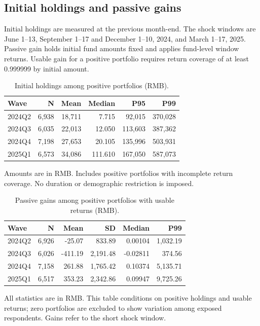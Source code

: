 \documentclass[11pt,letterpaper,english,final]{article}
\begin{document}
\clearpage
\subsection{Initial holdings and passive gains}
Initial holdings are measured at the previous month-end. The shock windows are June 1--13, September 1--17 and December 1--10, 2024, and March 1--17, 2025. Passive gain holds initial fund amounts fixed and applies fund-level window returns. Usable gain for a positive portfolio requires return coverage of at least 0.999999 by initial amount.

\begin{table}[H]
\centering\small
\setlength{\tabcolsep}{5pt}
\caption{Initial holdings among positive portfolios (RMB).}
\begin{tabular}{lrrrrr}
\toprule
Wave & N & Mean & Median & P95 & P99 \\
\midrule
2024Q2 & 6,938 & 18,711 & 7.715 & 92,015 & 370,028 \\
2024Q3 & 6,035 & 22,013 & 12.050 & 113,603 & 387,362 \\
2024Q4 & 7,198 & 27,653 & 20.105 & 135,996 & 503,931 \\
2025Q1 & 6,573 & 34,086 & 111.610 & 167,050 & 587,073 \\
\bottomrule
\end{tabular}
\par\vspace{4pt}\begin{minipage}{\linewidth}\footnotesize Amounts are in RMB. Includes positive portfolios with incomplete return coverage. No duration or demographic restriction is imposed.\end{minipage}
\end{table}

\begin{table}[H]
\centering\small
\setlength{\tabcolsep}{5pt}
\caption{Passive gains among positive portfolios with usable returns (RMB).}
\begin{tabular}{lrrrrr}
\toprule
Wave & N & Mean & SD & Median & P99 \\
\midrule
2024Q2 & 6,926 & -25.07 & 833.89 & 0.00104 & 1,032.19 \\
2024Q3 & 6,026 & -411.19 & 2,191.48 & -0.02811 & 374.56 \\
2024Q4 & 7,158 & 261.88 & 1,765.42 & 0.10374 & 5,135.71 \\
2025Q1 & 6,517 & 353.23 & 2,342.86 & 0.09947 & 9,725.26 \\
\bottomrule
\end{tabular}
\par\vspace{4pt}\begin{minipage}{\linewidth}\footnotesize All statistics are in RMB. This table conditions on positive holdings and usable returns; zero portfolios are excluded to show variation among exposed respondents. Gains refer to the short shock window.\end{minipage}
\end{table}
\end{document}
